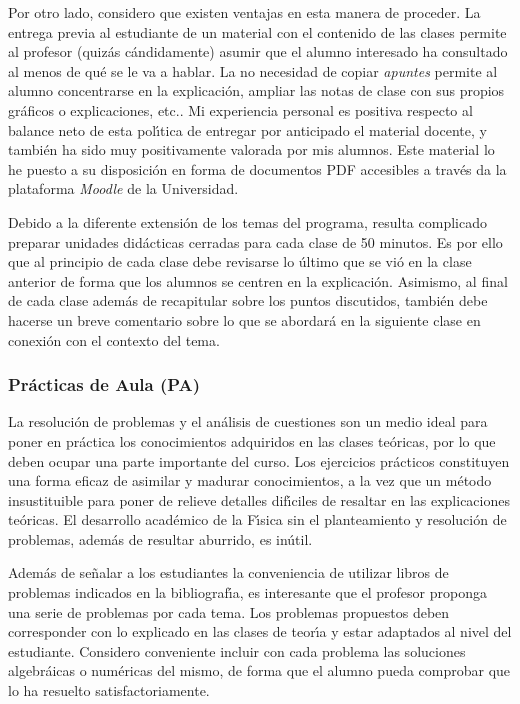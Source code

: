 Por otro lado, considero  que existen ventajas en esta manera de proceder.
La entrega previa al estudiante  de un material  con el contenido de las clases
 permite al profesor
(quiz\'{a}s c\'{a}ndidamente) asumir que el alumno
interesado ha consultado al menos de qu\'{e} se le va a hablar.
La no necesidad de copiar
\emph{apuntes} permite al alumno concentrarse en la explicaci\'{o}n,
ampliar las notas de clase con sus propios gr\'{a}ficos o explicaciones, etc..
Mi experiencia personal es positiva respecto
al balance neto de esta pol\'\i tica de entregar por anticipado 
el material docente, y tambi\'{e}n ha sido muy positivamente valorada por
mis alumnos.
Este material lo he puesto a su disposici\'{o}n
 en forma de documentos PDF accesibles a trav\'{e}s da la 
plataforma {\it Moodle} de la Universidad. 

Debido a la diferente extensi\'{o}n de los temas del programa, 
resulta complicado preparar unidades did\'{a}cticas cerradas para cada clase
de 50 minutos. Es por ello que al principio de cada clase debe revisarse
lo \'{u}ltimo que se vi\'{o} en la clase anterior de forma que los alumnos 
se centren en la explicaci\'{o}n. Asimismo, al final de 
cada clase adem\'{a}s de recapitular sobre los puntos discutidos, 
tambi\'{e}n debe hacerse un breve comentario sobre lo que se abordar\'{a}
en la siguiente clase  en conexi\'{o}n con el contexto del tema.



\subsubsection{Pr\'{a}cticas de Aula (PA)}
La resoluci\'{o}n de problemas y el an\'{a}lisis de cuestiones son un
 medio ideal para poner en pr\'{a}ctica los conocimientos adquiridos 
en las clases te\'{o}ricas, por lo que deben ocupar una parte importante 
del curso. Los ejercicios pr\'{a}cticos constituyen una forma eficaz 
de asimilar y madurar  conocimientos,  a la vez
que un m\'{e}todo insustituible para poner de relieve detalles dif\'{\i}ciles
de resaltar en las explicaciones te\'{o}ricas. 
El desarrollo acad\'{e}mico
 de la F\'{\i}sica sin el planteamiento y resoluci\'{o}n de problemas,
 adem\'{a}s de resultar aburrido, es in\'{u}til.


Adem\'{a}s de se\~{n}alar a los estudiantes la conveniencia de utilizar
  libros de problemas indicados en la bibliograf\'{\i}a, 
es interesante que el profesor proponga una serie de problemas por cada tema.
 Los problemas propuestos deben corresponder con lo explicado en las clases 
de teor\'{\i}a y estar adaptados al nivel del estudiante.
Considero  conveniente incluir con cada problema 
 las soluciones algebr\'{a}icas o num\'{e}ricas del mismo,
 de forma que el alumno pueda 
comprobar que lo ha resuelto satisfactoriamente.

